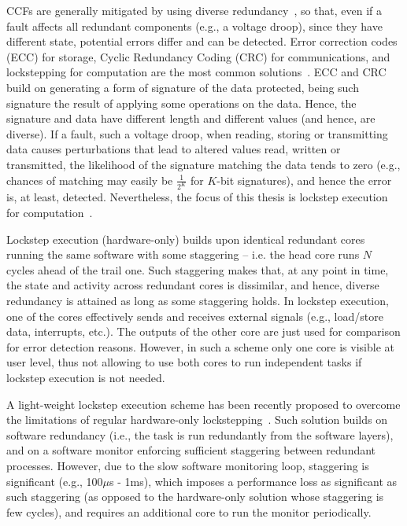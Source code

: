 CCFs are generally mitigated by using diverse redundancy~\cite{ClassicDiversity}, so that, even if a fault affects all redundant components (e.g., a voltage droop), since they have different state, potential errors differ and can be detected. Error correction codes (ECC) for storage, Cyclic Redundancy Coding (CRC) for communications, and lockstepping for computation are the most common solutions~\cite{alcaide2019software}. ECC and CRC build on generating a form of signature of the data protected, being such signature the result of applying some operations on the data. Hence, the signature and data have different length and different values (and hence, are diverse). If a fault, such a voltage droop, when reading, storing or transmitting data causes perturbations that lead to altered values read, written or transmitted, the likelihood of the signature matching the data tends to zero (e.g., chances of matching may easily be $\frac{1}{2^K}$ for $K$-bit signatures), and hence the error is, at least, detected.
Nevertheless, the focus of this thesis is lockstep execution for computation~\cite{STlockstep,infineon2012aurix,iturbe2019arm,paper1}. 

Lockstep execution (hardware-only) builds upon identical redundant cores running the same software with some staggering -- i.e. the head core runs $N$ cycles ahead of the trail one. Such staggering makes that, at any point in time, the state and activity across redundant cores is dissimilar, and hence, diverse redundancy is attained as long as some staggering holds.
In lockstep execution, one of the cores effectively sends and receives external signals (e.g., load/store data, interrupts, etc.). The outputs of the other core are just used for comparison for error detection reasons. However, in such a scheme only one core is visible at user level, thus not allowing to use both cores to run independent tasks if lockstep execution is not needed.

A light-weight lockstep execution scheme has been recently proposed to overcome the limitations of regular hardware-only lockstepping~\cite{alcaide2020software}. Such solution builds on software redundancy (i.e., the task is run redundantly from the software layers), and on a software monitor enforcing sufficient staggering between redundant processes. However, due to the slow software monitoring loop, staggering is significant (e.g., 100$\mu$s - 1ms), which imposes a performance loss as significant as such staggering (as opposed to the hardware-only solution whose staggering is few cycles), and requires an additional core to run the monitor periodically.

